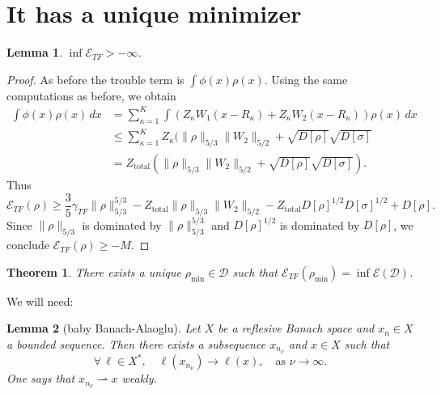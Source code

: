 \documentclass[11pt]{amsart}
\newtheorem{thm}{Theorem}
\newtheorem{lem}{Lemma}
\theoremstyle{definition}
\theoremstyle{definition}
\theoremstyle{definition}
\numberwithin{equation}{section}
\begin{document}
\section{It has a unique minimizer} 
\begin{lem}
$\inf\mathcal{E}_{TF}>-\infty$.
\end{lem}
\begin{proof}
As before the trouble term is $\int \phi(x)\rho(x)$. Using the same computations as before, we obtain
\begin{align*}
\int \phi(x)\rho(x)\,dx&=\sum_{\kappa=1}^{K}\int(Z_\kappa W_1(x-R_\kappa)+Z_\kappa W_2(x-R_\kappa))\rho(x)\,dx\\
&\le\sum_{\kappa=1}^K Z_\kappa(\|\rho\|_{5/3}\|W_2\|_{5/2}+\sqrt{D[\rho]}\sqrt{D[\sigma]}\\
&=Z_\text{total}(\|\rho\|_{5/3}\|W_2\|_{5/2}+\sqrt{D[\rho]}\sqrt{D[\sigma]}).
\end{align*}
Thus
\begin{equation}\label{eqn:ETF-lower-bound}
\mathcal{E}_{TF}(\rho)\ge\frac{3}{5}\gamma_{TF}\|\rho\|_{5/3}^{5/3}-Z_\text{total}\|\rho\|_{5/3}\|W_2\|_{5/2}-Z_\text{total}D[\rho]^{1/2}D[\sigma]^{1/2}+D[\rho].
\end{equation}
Since $\|\rho\|_{5/3}$ is dominated by $\|\rho\|_{5/3}^{5/3}$ and $D[\rho]^{1/2}$ is dominated by $D[\rho]$, we conclude $\mathcal{E}_{TF}(\rho)\ge-M$.
\end{proof}

\begin{thm}
There exists a unique $\rho_\mathrm{min}\in\mathcal{D}$ such that $\mathcal{E}_{TF}(\rho_\mathrm{min})=\inf\mathcal{E}(\mathcal{D})$.
\end{thm}

We will need:
\begin{lem}[baby Banach-Alaoglu]
Let $X$ be a reflesive Banach space and $x_n\in X$ a bounded sequence. Then there exists a subsequence $x_{n_\nu}$ and $x\in X$ such that
\[
\forall\,\ell\in X^*,\quad \ell(x_{n_\nu})\to \ell(x),\quad\text{as }\nu\to\infty.
\]
One says that $x_{n_\nu}\rightharpoonup x$ \emph{weakly}.
\end{lem}
\end{document}
